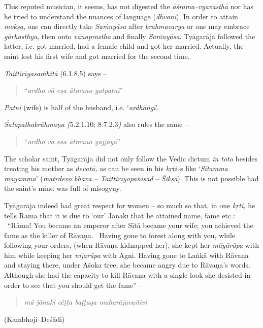 This reputed musician, it seems, has not digested the \textit{āśrama–vyavasthā} nor has he tried to understand the nuances of language (\textit{dhvani}). In order to attain \textit{mokṣa}, one can directly take \textit{Saṁnyāsa} after \textit{brahmacarya} or one may embrace \textit{gārhasthya}, then onto \textit{vānaprastha} and finally \textit{Saṁnyāsa}. Tyāgarāja followed the latter, i.e. got married, had a female child and got her married. Actually, the saint lost his first wife and got married for the second time.

\textit{Taittirīyasaṁhitā} (6.1.8.5) says –

\begin{verse}
“\textit{ardho vā eṣa ātmano yatpatnī}”
\end{verse}

\textit{Patnī} (wife) is half of the husband, i.e. ‘\textit{ardhāṅgī}’.

\textit{Śatapathabrāhmaṇa (}5.2.1.10; 8.7.2.3\textit{)} also rules the same \textit{–}

\begin{verse}
\textit{}“\textit{ardho vā eṣa ātmano yajjāyā}”
\end{verse}

The scholar saint, Tyāgarāja did not only follow the Vedic dictum \textit{in toto} besides treating his mother as \textit{devatā,} as can be seen in his \textit{kṛti}–s like ‘\textit{Sītamma māyamma}’ (\textit{mātṛdevo bhava – Taittirīyopaniṣad} – \textit{Śikṣā}). This is not possible had the saint’s mind was full of misogyny.

Tyāgarāja indeed had great respect for women – so much so that, in one \textit{kṛti,} he tells Rāma that it is due to ‘our’ Jānakī that he attained name, fame etc.:  “Rāma! You became an emperor after Sītā became your wife; you achieved the fame as the killer of Rāvaṇa.  Having gone to forest along with you, while following your orders, (when Rāvaṇa kidnapped her), she kept her \textit{māyārūpa} with him while keeping her \textit{nijarūpa} with Agni. Having gone to Laṅkā with Rāvaṇa and staying there, under Aśoka tree, she became angry due to Rāvaṇa’s words. Although she had the capacity to kill Rāvaṇa with a single look she desisted in order to see that you should get the fame” –  

\begin{verse}
\textit{mā jānaki cêṭṭa baṭṭaga maharājavaitivi} 
\end{verse}

\begin{flushright}
(Kambhoji–Deśādi)
\end{flushright}

